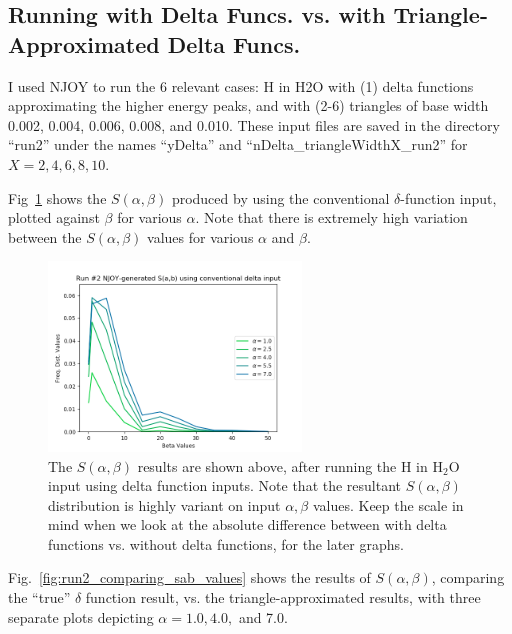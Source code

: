 \documentclass[a4paper]{article}
\begin{document}
\subsection{Running with Delta Funcs. vs. with Triangle-Approximated Delta Funcs.}
I used NJOY to run the 6 relevant cases: H in H2O with (1) delta functions approximating the higher energy peaks, and with (2-6) triangles of base width 0.002, 0.004, 0.006, 0.008, and 0.010. These input files are saved in the directory ``run2'' under the names ``yDelta'' and ``nDelta\_triangleWidthX\_run2'' for $X=2,4,6,8,10$.\par
Fig~\ref{fig:run2_just_delta} shows the $S(\alpha,\beta)$ produced by using the conventional $\delta$-function input, plotted against $\beta$ for various $\alpha$. Note that there is extremely high variation between the $S(\alpha,\beta)$ values for various $\alpha$ and $\beta$.\par
\begin{figure}[H]
\centering
\includegraphics[width=0.6\textwidth]{run2_sab_using_just_delta_funcs.png}
\caption{\label{fig:run2_just_delta} The $S(\alpha,\beta)$ results are shown above, after running the H in H$_2$O input using delta function inputs. Note that the resultant $S(\alpha,\beta)$ distribution is highly variant on input $\alpha,\beta$ values. Keep the scale in mind when we look at the absolute difference between with delta functions vs. without delta functions, for the later graphs.}
\end{figure}

Fig.~\ref{fig:run2_comparing_sab_values} shows the results of $S(\alpha,\beta)$, comparing the ``true'' $\delta$ function result, vs. the triangle-approximated results, with three separate plots depicting $\alpha=1.0,4.0,$ and 7.0.
\end{document}

